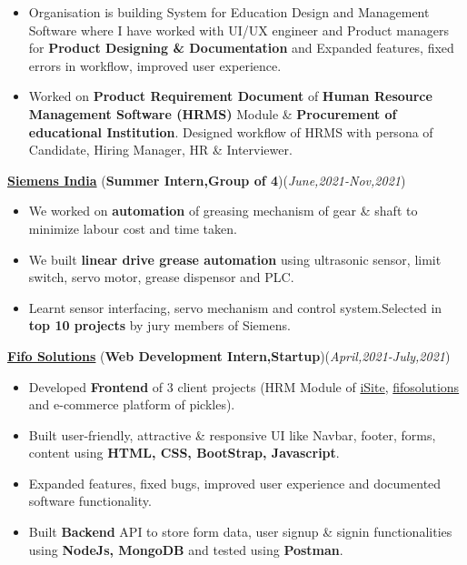 \documentclass[10pt]{extarticle}
\begin{document}
    \begin{itemize}
       \item Organisation is building System for Education Design and Management Software where I have worked with UI/UX engineer and Product managers for \textbf{Product Designing \& Documentation} and Expanded features, fixed errors in workflow, improved user experience.
       \item Worked on \textbf{Product Requirement Document} of \textbf{Human Resource Management Software (HRMS)} Module \& \textbf{Procurement of educational Institution}. Designed workflow of HRMS with persona of Candidate, Hiring Manager, HR \& Interviewer.
    \end{itemize}
\vspace{3pt}
\href{https://github.com/PSoni8/Siemens-2021-2022-Internship}{\textbf{Siemens India}} (\textbf{Summer Intern,Group of 4})\hfill\hfill(\textit{June,2021-Nov,2021})
     \begin{itemize}
         \item We worked on \textbf{automation} of greasing mechanism of gear \& shaft to minimize labour cost and time taken.
         \item We built \textbf{linear drive grease automation} using ultrasonic sensor, limit switch, servo motor, grease dispensor and PLC. 
         \item Learnt sensor interfacing, servo mechanism and control system.Selected in \textbf{top 10 projects} by jury members of Siemens.
     \end{itemize}
\vspace{3pt}
\href{https://github.com/PSoni8/FIFO-Solutions-Internship}{\textbf{Fifo Solutions}} (\textbf{Web Development Intern,Startup})\hfill\hfill(\textit{April,2021-July,2021})
    \begin{itemize}
        \item Developed \textbf{Frontend} of 3 client projects (HRM Module of \href{https://isiteinfo.com/}{iSite}, \href{https://www.fifosolutions.com/}{fifosolutions} and e-commerce platform of pickles).
        \item Built user-friendly, attractive \& responsive UI like Navbar, footer, forms, content using \textbf{HTML, CSS, BootStrap, Javascript}.
        \item Expanded features, fixed bugs, improved user experience and documented software functionality.
        \item Built \textbf{Backend} API to store form data, user signup \& signin functionalities using \textbf{NodeJs, MongoDB} and tested using \textbf{Postman}.
    \end{itemize}
\end{document}

